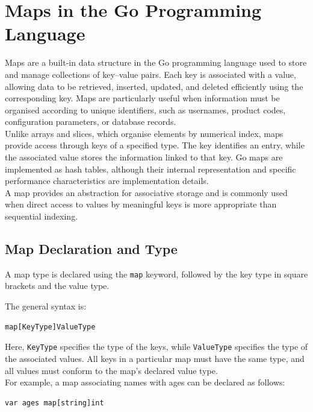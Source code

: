 \section{Maps in the Go Programming Language}

Maps are a built-in data structure in the Go programming language
used to store and manage collections of key--value pairs. Each
key is associated with a value, allowing data to be retrieved,
inserted, updated, and deleted efficiently using the corresponding
key. Maps are particularly useful when information must be
organised according to unique identifiers, such as usernames,
product codes, configuration parameters, or database records.\\

Unlike arrays and slices, which organise elements by numerical
index, maps provide access through keys of a specified type.
The key identifies an entry, while the associated value stores
the information linked to that key. Go maps are implemented as
hash tables, although their internal representation and specific
performance characteristics are implementation details.\\

A map provides an abstraction for associative storage and is
commonly used when direct access to values by meaningful keys
is more appropriate than sequential indexing.

\subsection{Map Declaration and Type}

A map type is declared using the \texttt{map} keyword, followed
by the key type in square brackets and the value type.

The general syntax is:

\begin{lstlisting}
map[KeyType]ValueType
\end{lstlisting}

Here, \texttt{KeyType} specifies the type of the keys, while
\texttt{ValueType} specifies the type of the associated values.
All keys in a particular map must have the same type, and all
values must conform to the map's declared value type.\\

For example, a map associating names with ages can be declared
as follows:

\begin{lstlisting}
var ages map[string]int
\end{lstlisting}

